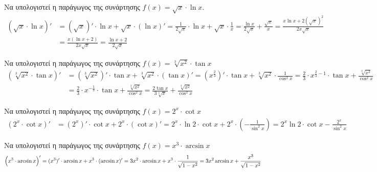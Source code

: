 \begin{exercise} Να υπολογιστεί η παράγωγος της συνάρτησης 
  $ f(x) = \sqrt{x} \cdot \ln{x} $.
  \begin{align*}
    (\sqrt{x} \cdot \ln{x} )' 
        &= (\sqrt{x} )'\cdot \ln{x} + \sqrt{x} \cdot (\ln{x}
        )' = \frac{1}{2 \sqrt{x} } \cdot \ln{x} + \sqrt{x} \cdot \frac{1}{x} =
        \frac{\ln{x}}{2 \sqrt{x}} + \frac{\sqrt{x}}{x} = 
        \frac{x \ln{x}+ 2 (\sqrt{x})^{2}}{2 x \sqrt{x} } \\
        &= \frac{x (\ln{x} + 2)}{2x \sqrt{x}} = \frac{\ln{x} +2}{2 \sqrt{x}}
  \end{align*}
\end{exercise}

\begin{exercise} Να υπολογιστεί η παράγωγος της συνάρτησης 
$ f(x) = \sqrt[3]{x^{2}} \cdot \tan{x} $
  \begin{align*}
    (\sqrt[3]{x^{2}} \cdot \tan{x} )' 
  &= (\sqrt[3]{x^{2}} )' \cdot \tan{x} +
  \sqrt[3]{x^{2}} \cdot (\tan{x} )' = (x^{\frac{2}{3}})' \cdot \tan{x} +
  \sqrt[3]{x^{2}} \cdot \frac{1}{\cos^{2}{x}} = \frac{2}{3} \cdot x^{\frac{2}{3}
  -1} \cdot \tan{x} + \frac{\sqrt[3]{x^{2}}}{\cos^{2}{x}} \\
  &= \frac{2}{3} \cdot x^{- \frac{1}{3} } \cdot \tan{x} + 
  \frac{\sqrt[3]{x^{2}}}{\cos^{2}{x}} = \frac{2 \tan{x}}{3 \sqrt[3]{x}} +
  \frac{\sqrt[3]{x^{2}}}{\cos^{2}{x}} 
  \end{align*}
\end{exercise}

\begin{exercise} Να υπολογιστεί η παράγωγος της συνάρτησης 
  $ f(x) = 2^{x} \cdot \cot{x} $
  \begin{align*}
    (2^{x}\cdot \cot{x})' 
      &= (2^{x})' \cdot \cot{x} + 2^{x} \cdot (\cot{x} )' =
      2^{x}\cdot \ln{2} \cdot \cot{x} + 2^{x}\cdot (- \frac{1}{\sin^{2}{x}}) = 
      2^{x} \ln{2} \cdot \cot{x} - \frac{2^{x}}{\sin^{2}{x}} 
  \end{align*}
\end{exercise}

\begin{exercise} Να υπολογιστεί η παράγωγος της συνάρτησης 
  $ f(x) = x^{3} \cdot \arcsin{x} $
  \[
    \Bigl(x^{3}\cdot \arcsin{x}\Bigr)' = (x^{3})' \cdot \arcsin{x} + x^{3} \cdot (\arcsin{x} )' = 
    3x^{2} \cdot \arcsin{x} + x^{3} \cdot \frac{1}{\sqrt{1-x^{2}}} = 3x^{2} \arcsin{x}
    + \frac{x^{3}}{\sqrt{1 - x^{2}}} 
  \]
\end{exercise}

